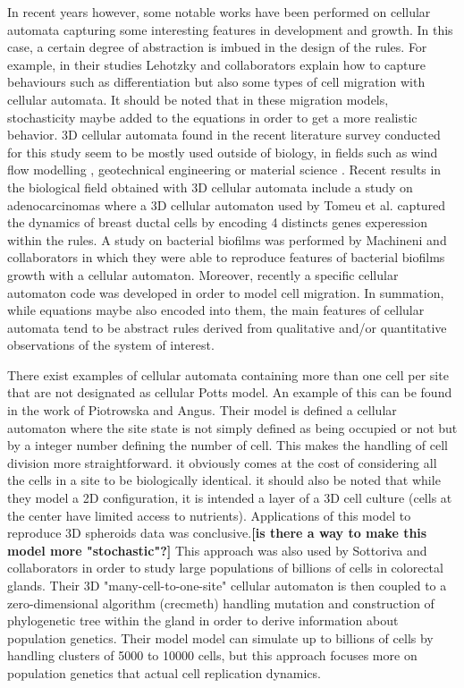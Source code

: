 \documentclass[11pt,a4paper]{article}
\begin{document}
In recent years however, some notable works have been performed on cellular automata capturing some interesting features in development and growth. In this case, a certain degree of abstraction is imbued in the design of the rules. For example, in their studies Lehotzky and collaborators explain how to capture behaviours such as differentiation but also some types of cell migration with cellular automata.\cite{Lehotzky2019}\cite{Lehotzky2020} It should be noted that in these migration models, stochasticity maybe added to the equations in order to get a more realistic behavior.\cite{NavaSedeno2020} 
3D cellular automata found in the recent literature survey conducted for this study seem to be mostly used outside of biology, in fields such as wind flow modelling \cite{Byari2022}, geotechnical engineering \cite{Ozelim2018} or material science \cite{Ma2022}. Recent results in the biological field obtained with 3D cellular automata include a study on adenocarcinomas \cite{Tomeu2022} where a 3D cellular automaton used by Tomeu et al. captured the dynamics of breast ductal cells by encoding 4 distincts genes experession within the rules. A study on bacterial biofilms was performed by Machineni and collaborators in which they were able to reproduce features of bacterial biofilms growth with a cellular automaton.\cite{Machineni2017} Moreover, recently a specific cellular automaton code was developed in order to model cell migration\cite{Deutsch2021}. In summation, while equations maybe also encoded into them, the main features of cellular automata tend to be abstract rules derived from qualitative and/or quantitative observations of the system of interest.

There exist examples of cellular automata containing more than one cell per site that are not designated as cellular Potts model. An example of this can be found in the work of Piotrowska and Angus.\cite{Piotrowska2009} Their model is defined a cellular automaton where the site state is not simply defined as being occupied or not but by a integer number defining the number of cell. This makes the handling of cell division more straightforward. it obviously comes at the cost of considering all the cells in a site to be biologically identical. it should also be noted that while they model a 2D configuration, it is intended a layer of a 3D cell culture (cells at the center have limited access to nutrients).  Applications of this model to reproduce 3D spheroids data was conclusive.\cite{Angus2012}\textbf{[is there a way to make this model more "stochastic"?]} This approach was also used by Sottoriva and collaborators in order to study large populations of billions of cells in colorectal glands.\cite{Sottoriva2012}\cite{Sottoriva2015}\cite{Sun2017} Their 3D "many-cell-to-one-site" cellular automaton is then coupled to a zero-dimensional algorithm (crecmeth) handling mutation and construction of phylogenetic tree within the gland in order to derive information about population genetics. Their model model can simulate up to billions of cells by handling clusters of 5000 to 10000 cells, but this approach focuses more on population genetics that actual cell replication dynamics.
\end{document}
